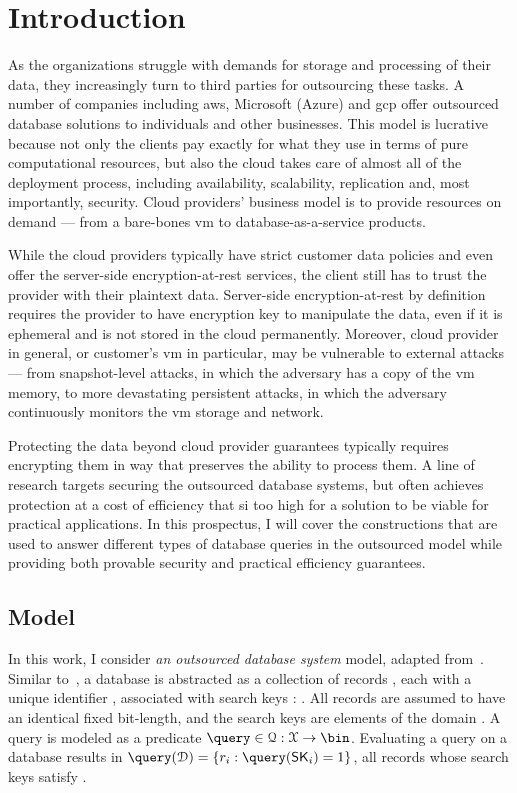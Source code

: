 \chapter{Introduction}
\thispagestyle{myheadings}

	As the organizations struggle with demands for storage and processing of their data, they increasingly turn to third parties for outsourcing these tasks.
	A number of companies including \Gls{aws}, Microsoft (Azure) and  \Gls{gcp} offer outsourced database solutions to individuals and other businesses.
	This model is lucrative because not only the clients pay exactly for what they use in terms of pure computational resources, but also the cloud takes care of almost all of the deployment process, including availability, scalability, replication and, most importantly, security.
	Cloud providers' business model is to provide resources on demand --- from a bare-bones \Gls{vm} to database-as-a-service products.

	While the cloud providers typically have strict customer data policies and even offer the server-side encryption-at-rest services, the client still has to trust the provider with their plaintext data.
	Server-side encryption-at-rest by definition requires the provider to have encryption key to manipulate the data, even if it is ephemeral and is not stored in the cloud permanently.
	Moreover, cloud provider in general, or customer's \Gls{vm} in particular, may be vulnerable to external attacks --- from snapshot-level attacks, in which the adversary has a copy of the \Gls{vm} memory, to more devastating persistent attacks, in which the adversary continuously monitors the \Gls{vm} storage and network.

	Protecting the data beyond cloud provider guarantees typically requires encrypting them in way that preserves the ability to process them.
	A line of research targets securing the outsourced database systems, but often achieves protection at a cost of efficiency that si too high for a solution to be viable for practical applications.
	In this prospectus, I will cover the constructions that are used to answer different types of database queries in the outsourced model while providing both provable security and practical efficiency guarantees.

	\section{Model}

		In this work, I consider \emph{an outsourced database system} model, adapted from~\cite{generic-attacks-kellaris}.
		Similar to~\cite{epsolute}, a database is abstracted as a collection of \dataSize{} records \record{}, each with a unique identifier \recordID{}, associated with search keys \searchKey{}: \databaseDef{}.
		All records are assumed to have an identical fixed bit-length, and the search keys are elements of the domain \searchKeyDomain{}.
		A query is modeled as a predicate $\query \in \querySet: \searchKeyDomain \to \bin$.
		Evaluating a query \query{} on a database \database{} results in $\query( \database ) = \{ \record_i : \query( \searchKey_i ) = 1 \}$, all records whose search keys satisfy \query{}.

